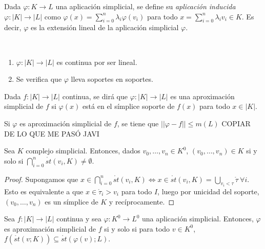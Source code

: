 \documentclass[HS.tex]{subfiles}
\begin{document}
\begin{defi}
Dada $\varphi:K\to L$ una aplicación simplicial, se define su \emph{aplicación inducida} $\varphi:|K|\to|L|$ como $\varphi(x)=\sum_{i=0}^n\lambda_i\varphi(v_i)$ para todo $x=\sum_{i=0}^n\lambda_iv_i\in K$. Es decir, $\varphi$ es la extensión lineal de la aplicación simplicial $\varphi$.
\end{defi}

\begin{nota}\
\begin{enumerate}
\item $\varphi:|K|\to|L|$ es continua por ser lineal.
\item Se verifica que $\varphi$ lleva soportes en soportes.
\end{enumerate}
\end{nota}

\begin{defi}
Dada $f:|K|\to|L|$ continua, se dirá que $\varphi:|K|\to |L|$ es una aproximación simplicial de $f$ si $\varphi(x)$ está en el símplice soporte de $f(x)$ para todo $x\in|K|$.
\end{defi}

\begin{nota}
Si $\varphi$ es aproximación simplicial de $f$, se tiene que $||\varphi-f||\leq m(L)$ COPIAR DE LO QUE ME PASÓ JAVI
\end{nota}

\begin{lemma}
Sea $K$ complejo simplicial. Entonces, dados $v_0,\dots, v_n\in K^0$,  $(v_0,\dots, v_n)\in K$ si y solo si $\bigcap_{i=0}^n\mathring{st}(v_i,K)\neq\emptyset$.
\end{lemma}
\begin{proof}
Supongamos que $x\in \bigcap_{i=0}^n\mathring{st}(v_i,K)\Leftrightarrow x\in \mathring{st}(v_i,K)=\bigcup_{v_i<\tau}\mathring{\tau}\ \forall i$. Esto es equivalente a que $x\in \mathring{\tau}_i>v_i$ para todo $I$, luego por unicidad del soporte, $(v_0,\dots, v_n)$ es un símplice de $K$ y recíprocamente. 
\end{proof}

\begin{prop} 
Sea $f:|K|\to|L|$ continua y sea $\varphi:K^0\to L^0$ una aplicación simplicial. Entonces, $\varphi$ es aproximación simplicial de $f$ si y solo si para todo $v\in K^0$, $f(\mathring{st}(v;K))\subseteq \mathring{st}(\varphi(v);L)$. 
\end{prop}
\end{document}
